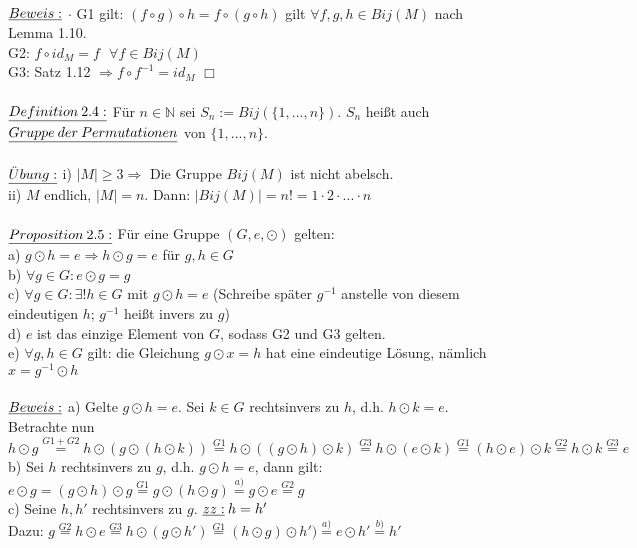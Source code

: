 \documentclass[fleqn, a4paper, 11pt]{article}
\begin{document}
\\
$\uline{Beweis:}$ $\cdot$ G1 gilt: $(f\circ g)\circ h=f\circ(g\circ h)$ gilt $\forall f,g,h\in Bij(M)$ nach Lemma 1.10.\\
G2: $f\circ id_{M}=f\:\:\:\forall f\in Bij(M)$\\
G3: Satz 1.12 $\Rightarrow f\circ f^{-1}=id_{M}$ \hfill $\Box$\\
\\
$\uline{Definition\:2.4:}$ F\"ur $n\in\mathbb{N}$ sei $S_{n}:=Bij(\{1,...,n\})$. $S_{n}$ hei\ss{}t auch $\uline{Gruppe\:der\:Permutationen}$ von $\{1,...,n\}$.\\
\\
$\uline{\ddot{U}bung:}$ i) $|M|\geq 3 \Rightarrow$ Die Gruppe $Bij(M)$ ist nicht abelsch.\\
ii) $M$ endlich, $|M|=n$. Dann: $|Bij(M)|=n!=1\cdot 2\cdot ... \cdot n$\\
\\
$\uline{Proposition\:2.5:}$ F\"ur eine Gruppe $(G,e,\odot)$ gelten:\\
a) $g\odot h=e\Rightarrow h\odot g=e$ f\"ur $g,h\in G$\\
b) $\forall g\in G:e\odot g=g$\\
c) $\forall g\in G:\exists !h\in G$ mit $g\odot h=e$ (Schreibe sp\"ater $g^{-1}$ anstelle von diesem eindeutigen $h$; $g^{-1}$ hei\ss{}t invers zu $g$)\\
d) $e$ ist das einzige Element von $G$, sodass G2 und G3 gelten.\\
e) $\forall g,h\in G$ gilt: die Gleichung $g\odot x=h$ hat eine eindeutige L\"osung, n\"amlich $x=g^{-1}\odot h$\\
\\
$\uline{Beweis:}$ a) Gelte $g\odot h=e$. Sei $k\in G$ rechtsinvers zu $h$, d.h. $h\odot k=e$. Betrachte nun $h\odot g\stackrel{G1+G2}{=} h\odot(g\odot(h\odot k))\stackrel{G1}{=} h\odot((g\odot h)\odot k) \stackrel{G3}{=} h\odot(e\odot k)\stackrel{G1}{=} (h\odot e)\odot k\stackrel{G2}{=} h\odot k\stackrel{G3}{=} e$\\
 b) Sei $h$ rechtsinvers zu $g$, d.h. $g\odot h=e$, dann gilt: $e\odot g=(g\odot h)\odot g\stackrel{G1}{=} g\odot(h\odot g)\stackrel{a)}{=} g\odot e\stackrel{G2}{=} g$\\
c) Seine $h,h'$ rechtsinvers zu $g$. $\uline{zz:}\:h=h'$\\
Dazu: $g\stackrel{G2}{=} h\odot e\stackrel{G3}{=} h\odot(g\odot h')\stackrel{G1}{=}(h\odot g)\odot h')\stackrel{a)}{=} e\odot h'\stackrel{b)}{=} h'$\\
\end{document}

